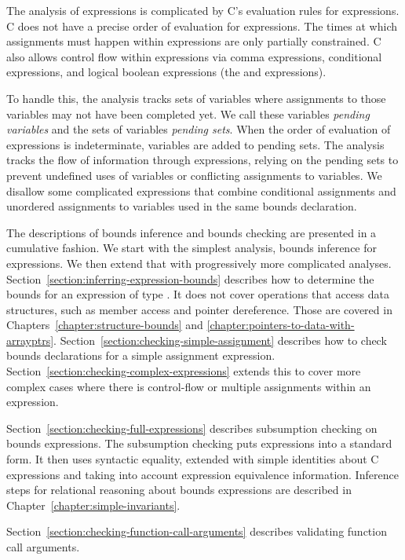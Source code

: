 The analysis of expressions is complicated by C's evaluation
rules for expressions.  C does not have a precise order of evaluation
for expressions.  The times at which assignments
must happen within expressions are only partially constrained.
C also allows control flow within 
expressions via comma expressions, conditional expressions, and
logical boolean expressions (the \code{&&} and \code{\|\|} expressions).

To handle this, the analysis tracks sets of variables where assignments
to those variables may not have been completed yet.  We call these
variables {\em pending variables} and the sets of variables {\em
pending sets}.  When the order of evaluation of expressions
is indeterminate, variables are added to pending sets.
The analysis tracks the flow of information through expressions, relying on the
pending sets to prevent undefined uses of variables or conflicting
assignments to variables.  We disallow some complicated expressions
that combine conditional assignments and unordered assignments
to variables used in the same bounds declaration.

The descriptions of bounds inference and bounds checking are
presented in a cumulative fashion.  We start with the simplest
analysis, bounds inference for expressions.  We then extend that
with progressively more complicated analyses.
Section~\ref{section:inferring-expression-bounds}
describes how to determine the bounds for an expression of type \arrayptr.
It does not cover operations that access data structures, such as member
access and pointer dereference. 
Those are covered in Chapters~\ref{chapter:structure-bounds} and 
\ref{chapter:pointers-to-data-with-arrayptrs}.
Section~\ref{section:checking-simple-assignment} describes
how to check bounds declarations for a simple assignment
expression.
Section~\ref{section:checking-complex-expressions}
extends this to cover more complex cases where there is control-flow
or multiple assignments within an expression.

Section~\ref{section:checking-full-expressions} describes
subsumption checking on bounds expressions.   The subsumption checking
puts expressions into a standard form.  It then uses syntactic equality,
extended with simple identities about C expressions and taking into account expression
equivalence information.
Inference steps for relational reasoning about bounds expressions 
are described in Chapter~\ref{chapter:simple-invariants}.

Section~\ref{section:checking-function-call-arguments}
describes validating function call arguments.

